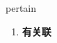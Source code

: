 
\begin{frame}
{\huge pertain}
\begin{center}
\begin{enumerate}\Large
  \item \textbf{有关联}
\end{enumerate}
\end{center}
\end{frame}
